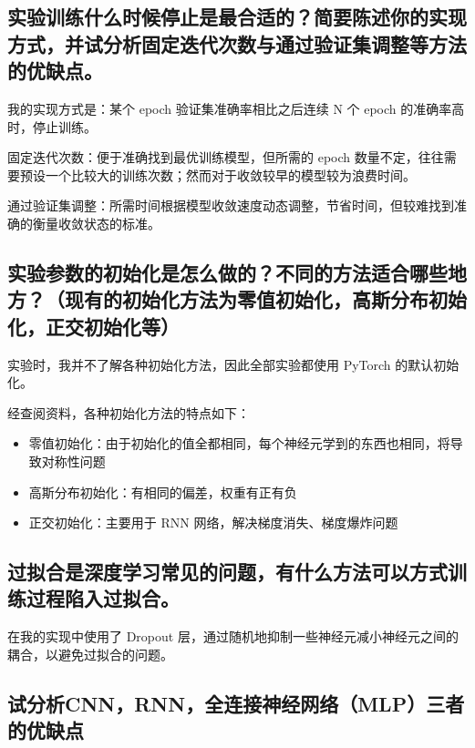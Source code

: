 \documentclass[a4paper]{article}
\begin{document}
\subsection*{实验训练什么时候停止是最合适的？简要陈述你的实现方式，并试分析固定迭代次数与通过验证集调整等方法的优缺点。}

我的实现方式是：某个 epoch 验证集准确率相比之后连续 N 个 epoch 的准确率高时，停止训练。

固定迭代次数：便于准确找到最优训练模型，但所需的 epoch 数量不定，往往需要预设一个比较大的训练次数；然而对于收敛较早的模型较为浪费时间。

通过验证集调整：所需时间根据模型收敛速度动态调整，节省时间，但较难找到准确的衡量收敛状态的标准。

\subsection*{实验参数的初始化是怎么做的？不同的方法适合哪些地方？（现有的初始化方法为零值初始化，高斯分布初始化，正交初始化等）}

实验时，我并不了解各种初始化方法，因此全部实验都使用 PyTorch 的默认初始化。

经查阅资料，各种初始化方法的特点如下：

\begin{itemize}
    \item 零值初始化：由于初始化的值全都相同，每个神经元学到的东西也相同，将导致对称性问题
    \item 高斯分布初始化：有相同的偏差，权重有正有负
    \item 正交初始化：主要用于 RNN 网络，解决梯度消失、梯度爆炸问题
\end{itemize}

\subsection*{过拟合是深度学习常见的问题，有什么方法可以方式训练过程陷入过拟合。}

在我的实现中使用了 Dropout 层，通过随机地抑制一些神经元减小神经元之间的耦合，以避免过拟合的问题。

\subsection*{试分析CNN，RNN，全连接神经网络（MLP）三者的优缺点}
\end{document}
